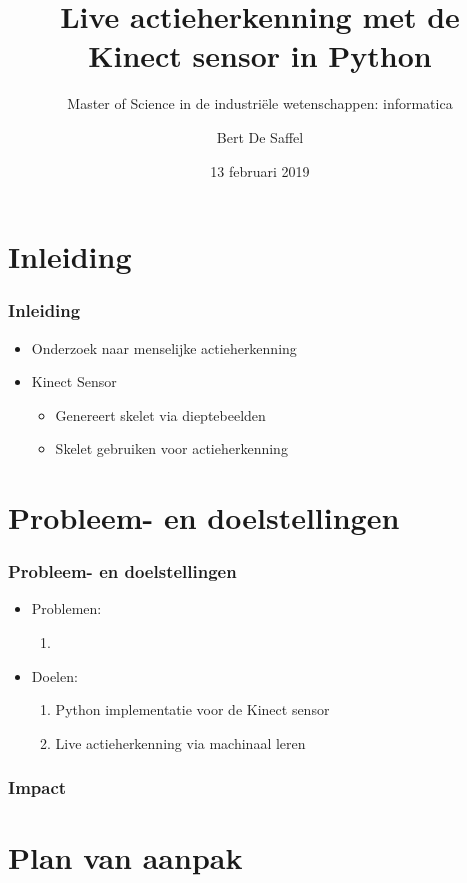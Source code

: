 \documentclass[notes]{beamer}
\title[Actieherkenning met de Kinect sensor]{Live actieherkenning met de Kinect sensor in Python}
\author{Bert De Saffel}
\date{13 februari 2019}
\subtitle{Master of Science in de industriële wetenschappen: informatica}
\begin{document}
	\frame{\titlepage}
	
	\section{Inleiding}
	
	\begin{frame}
	\frametitle{Inleiding}
		\begin{itemize}
			\item<1- > Onderzoek naar menselijke actieherkenning
			\item<2- > Kinect Sensor 
			\begin{itemize}
				\item<3- > Genereert skelet via dieptebeelden
				\item<4- > Skelet gebruiken voor actieherkenning
			\end{itemize}
		\end{itemize}
	\end{frame}

	
	\section{Probleem- en doelstellingen}
	\begin{frame}
	\frametitle{Probleem- en doelstellingen}
		\begin{itemize}
			\item Problemen:  		
				\begin{enumerate}
					\item 
				\end{enumerate}
			\item Doelen:
				\begin{enumerate}
					\item Python implementatie voor de Kinect sensor
					\item Live actieherkenning via machinaal leren
				\end{enumerate}
		\end{itemize}
	\end{frame}
	\begin{frame}
	\frametitle{Impact}
	
	\end{frame}

	\section{Plan van aanpak}
\end{document}
